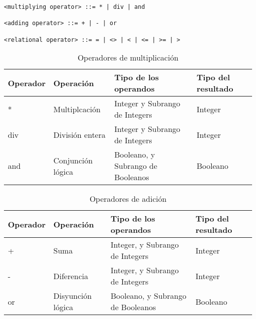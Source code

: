 \documentclass[a4paper,oneside]{report}
\begin{document}
\begin{verbatim}
<multiplying operator> ::= * | div | and

<adding operator> ::= + | - | or

<relational operator> ::= = | <> | < | <= | >= | >
\end{verbatim}

\begin{table}[htbp]
    \begin{tabular}{|l|l|l|l|}
	    
	    \hline \textbf{Operador} & \textbf{Operación} & \textbf{Tipo de los operandos }& \textbf{Tipo del resultado} \\
			\hline
	    *     & Multiplcación & Integer y Subrango de Integers & Integer \\
	    \hline
	    div   & División entera & Integer y Subrango de Integers & Integer \\
	    \hline
	    and   & Conjunción lógica & Booleano, y Subrango de Booleanos & Booleano \\
	    \hline
    \end{tabular}%
  \label{tab:opmul}%
  \caption{Operadores de multiplicación}
\end{table}%

\begin{table}[htbp]

  
    \begin{tabular}{|l|l|l|l|}
    \hline
    \textbf{Operador} & \textbf{Operación} & \textbf{Tipo de los operandos }& \textbf{Tipo del resultado} \\
		\hline
    +     & Suma  & Integer, y Subrango de Integers & Integer \\
    \hline
    
    -     & Diferencia & Integer, y Subrango de Integers & Integer \\
    \hline
    or    & Disyunción lógica & Booleano, y Subrango de Booleanos & Booleano \\
    \hline
    \end{tabular}%
  \label{tab:opsum}%
  
  \caption{Operadores de adición}
\end{table}%
\end{document}
